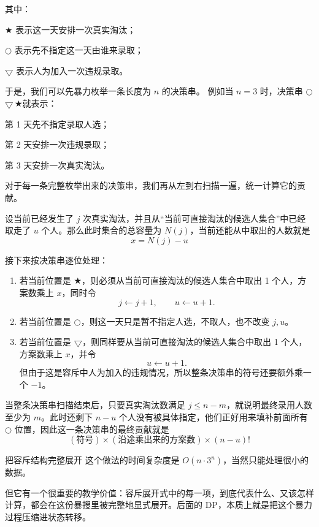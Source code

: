 \documentclass{book}
\newcommand{\FreeTake}{\ensuremath{\bigcirc}}
\newcommand{\BadTake}{\ensuremath{\bigtriangledown}}
\newcommand{\DropTake}{\ensuremath{\bigstar}}
\begin{document}
其中：

\quad $\DropTake$ 表示这一天安排一次真实淘汰；

\quad $\FreeTake$ 表示先不指定这一天由谁来录取；

\quad $\BadTake$ 表示人为加入一次违规录取。

于是，我们可以先暴力枚举一条长度为 $n$ 的决策串。  
例如当 $n=3$ 时，决策串 \FreeTake\,\BadTake\,\DropTake 就表示：

\quad 第 1 天先不指定录取人选；

\quad 第 2 天安排一次违规录取；

\quad 第 3 天安排一次真实淘汰。

对于每一条完整枚举出来的决策串，我们再从左到右扫描一遍，统一计算它的贡献。

设当前已经发生了 $j$ 次真实淘汰，并且从“当前可直接淘汰的候选人集合”中已经取走了 $u$ 个人。那么此时集合的总容量为 $N(j)$，当前还能从中取出的人数就是
\[
x = N(j) - u
\]

接下来按决策串逐位处理：

\begin{enumerate}[itemsep=1pt, topsep=2pt, parsep=0pt, partopsep=0pt]
    \item 若当前位置是 $\DropTake$，则必须从当前可直接淘汰的候选人集合中取出 1 个人，方案数乘上 $x$，同时令
    \[
    j \leftarrow j+1,\qquad u \leftarrow u+1.
    \]

    \item 若当前位置是 $\FreeTake$，则这一天只是暂不指定人选，不取人，也不改变 $j,u$。

    \item 若当前位置是 $\BadTake$，则同样要从当前可直接淘汰的候选人集合中取出 1 个人，方案数乘上 $x$，并令
    \[
    u \leftarrow u+1.
    \]
    但由于这是容斥中人为加入的违规情况，所以整条决策串的符号还要额外乘一个 $-1$。
\end{enumerate}

当整条决策串扫描结束后，只要真实淘汰数满足 $j \le n-m$，就说明最终录用人数至少为 $m$。此时还剩下 $n-u$ 个人没有被具体指定，他们正好用来填补前面所有 $\FreeTake$ 位置，因此这一条决策串的最终贡献就是
\[
(\text{符号}) \times (\text{沿途乘出来的方案数}) \times (n-u)!
\]

\begin{keybox}{把容斥结构完整展开}
这个做法的时间复杂度是 $O(n\cdot 3^n)$，当然只能处理很小的数据。

但它有一个很重要的教学价值：容斥展开式中的每一项，到底代表什么、又该怎样计算，都会在这份暴搜里被完整地显式展开。后面的 DP，本质上就是把这个暴力过程压缩进状态转移。
\end{keybox}
\end{document}
